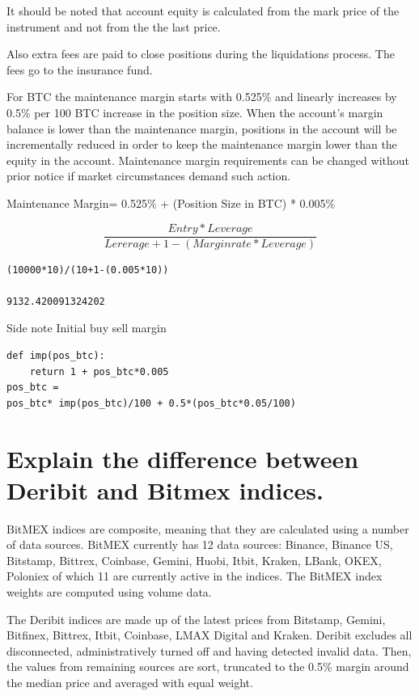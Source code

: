 It should be noted that account equity is calculated from the mark price of the instrument and not from the the last price.

Also extra fees are paid to close positions during the liquidations process. The fees go to the insurance fund.

For BTC the maintenance margin starts with 0.525\% and linearly increases by 0.5\% per 100 BTC increase in the position size. When the account's margin balance is lower than the maintenance margin, positions in the account will be incrementally reduced in order to keep the maintenance margin lower than the equity in the account. Maintenance margin requirements can be changed without prior notice if market circumstances demand such action.

 

Maintenance Margin= 0.525\% + (Position Size in BTC) * 0.005\%


$$\frac{Entry*Leverage}{Lererage + 1 - (Margin rate * Leverage)}$$

\begin{verbatim}
(10000*10)/(10+1-(0.005*10))

9132.420091324202
\end{verbatim}

Side note Initial buy sell margin

\begin{verbatim}
def imp(pos_btc):
    return 1 + pos_btc*0.005
pos_btc = 
pos_btc* imp(pos_btc)/100 + 0.5*(pos_btc*0.05/100)
\end{verbatim}

\section{ Explain the difference between Deribit and Bitmex indices.}
BitMEX indices are composite, meaning that they are calculated using a number of data sources. BitMEX currently has 12 data sources: Binance, Binance US, Bitstamp, Bittrex, Coinbase, Gemini, Huobi, Itbit, Kraken, LBank, OKEX, Poloniex of which 11 are currently active in the indices. The BitMEX index weights are computed using volume data.

The Deribit indices are made up of the latest prices from Bitstamp, Gemini, Bitfinex, Bittrex,  Itbit, Coinbase, LMAX Digital and Kraken. Deribit excludes all disconnected, administratively turned off and having detected invalid data. Then, the values from remaining sources are sort, truncated to the 0.5\% margin around the median price and averaged with equal weight.

